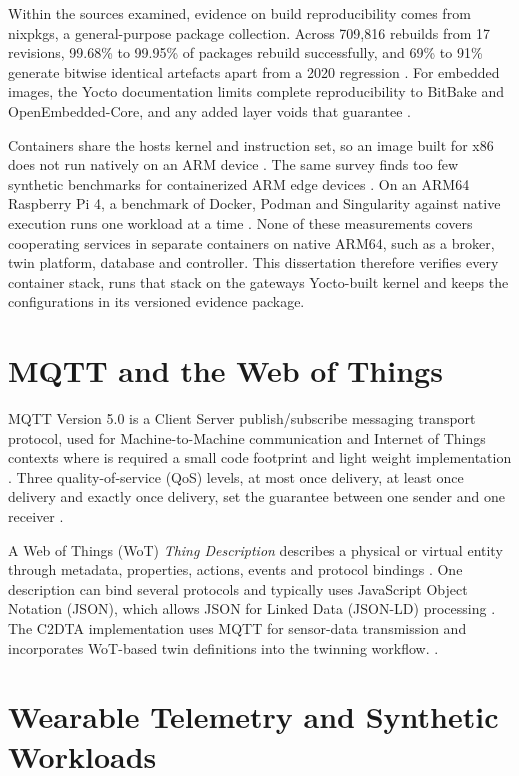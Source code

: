 Within the sources examined, evidence on build reproducibility comes from nixpkgs, a general-purpose package collection\cite{word14}. Across 709,816 rebuilds from 17 revisions, 99.68\% to 99.95\% of packages rebuild successfully, and 69\% to 91\% generate bitwise identical artefacts apart from a 2020 regression \cite{word14}. For embedded images, the Yocto documentation limits complete reproducibility to BitBake and OpenEmbedded-Core, and any added layer voids that guarantee \cite{word11}.

Containers share the host\textquotesingle s kernel and instruction set, so an image built for x86 does not run natively on an ARM device \cite{word15}. The same survey finds too few synthetic benchmarks for containerized ARM edge devices \cite{word15}. On an ARM64 Raspberry Pi 4, a benchmark of Docker, Podman and Singularity against native execution runs one workload at a time \cite{word16}. None of these measurements covers cooperating services in separate containers on native ARM64, such as a broker, twin platform, database and controller. This dissertation therefore verifies every container stack, runs that stack on the gateway\textquotesingle s Yocto-built kernel and keeps the configurations in its versioned evidence package.

\section{MQTT and the Web of Things}\label{mqtt-and-the-web-of-things}

\noindent MQTT Version 5.0 is a Client Server publish/subscribe messaging transport protocol, used for Machine-to-Machine communication and Internet of Things contexts where is required a small code footprint and light weight implementation \cite{word17}. Three quality-of-service (QoS) levels, at most once delivery, at least once delivery and exactly once delivery, set the guarantee between one sender and one receiver \cite{word17}.

A Web of Things (WoT) \emph{Thing Description} describes a physical or virtual entity through metadata, properties, actions, events and protocol bindings \cite{word18}. One description can bind several protocols and typically uses JavaScript Object Notation (JSON), which allows JSON for Linked Data (JSON-LD) processing \cite{word18}. The C2DTA implementation uses MQTT for sensor-data transmission and incorporates WoT-based twin definitions into the twinning workflow. \cite{word06}.

\section{Wearable Telemetry and Synthetic Workloads}\label{wearable-telemetry-and-synthetic-workloads}

